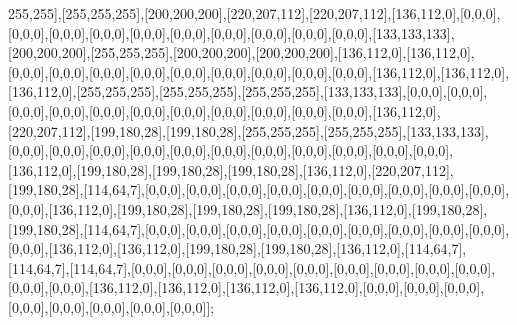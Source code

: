 255,255],[255,255,255],[200,200,200],[220,207,112],[220,207,112],[136,112,0],[0,0,0],[0,0,0],[0,0,0],[0,0,0],[0,0,0],[0,0,0],[0,0,0],[0,0,0],[0,0,0],[0,0,0],[133,133,133],[200,200,200],[255,255,255],[200,200,200],[200,200,200],[136,112,0],[136,112,0],[0,0,0],[0,0,0],[0,0,0],[0,0,0],[0,0,0],[0,0,0],[0,0,0],[0,0,0],[0,0,0],[136,112,0],[136,112,0],[136,112,0],[255,255,255],[255,255,255],[255,255,255],[133,133,133],[0,0,0],[0,0,0],[0,0,0],[0,0,0],[0,0,0],[0,0,0],[0,0,0],[0,0,0],[0,0,0],[0,0,0],[0,0,0],[136,112,0],[220,207,112],[199,180,28],[199,180,28],[255,255,255],[255,255,255],[133,133,133],[0,0,0],[0,0,0],[0,0,0],[0,0,0],[0,0,0],[0,0,0],[0,0,0],[0,0,0],[0,0,0],[0,0,0],[0,0,0],[136,112,0],[199,180,28],[199,180,28],[199,180,28],[136,112,0],[220,207,112],[199,180,28],[114,64,7],[0,0,0],[0,0,0],[0,0,0],[0,0,0],[0,0,0],[0,0,0],[0,0,0],[0,0,0],[0,0,0],[0,0,0],[136,112,0],[199,180,28],[199,180,28],[199,180,28],[136,112,0],[199,180,28],[199,180,28],[114,64,7],[0,0,0],[0,0,0],[0,0,0],[0,0,0],[0,0,0],[0,0,0],[0,0,0],[0,0,0],[0,0,0],[0,0,0],[136,112,0],[136,112,0],[199,180,28],[199,180,28],[136,112,0],[114,64,7],[114,64,7],[114,64,7],[0,0,0],[0,0,0],[0,0,0],[0,0,0],[0,0,0],[0,0,0],[0,0,0],[0,0,0],[0,0,0],[0,0,0],[0,0,0],[136,112,0],[136,112,0],[136,112,0],[136,112,0],[0,0,0],[0,0,0],[0,0,0],[0,0,0],[0,0,0],[0,0,0],[0,0,0],[0,0,0]];

